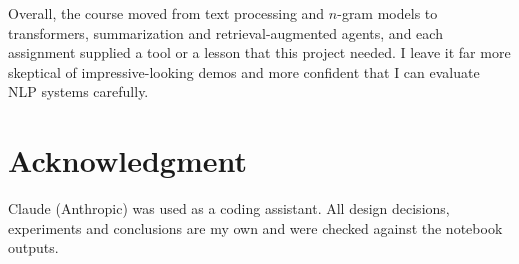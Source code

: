 \documentclass[conference]{IEEEtran}
\begin{document}
Overall, the course moved from text processing and $n$-gram models to transformers, summarization and
retrieval-augmented agents, and each assignment supplied a tool or a lesson that this project needed. I leave it
far more skeptical of impressive-looking demos and more confident that I can evaluate NLP systems carefully.

\section*{Acknowledgment}
Claude (Anthropic) was used as a coding assistant. All design decisions, experiments and conclusions are my own and
were checked against the notebook outputs.




\end{document}

